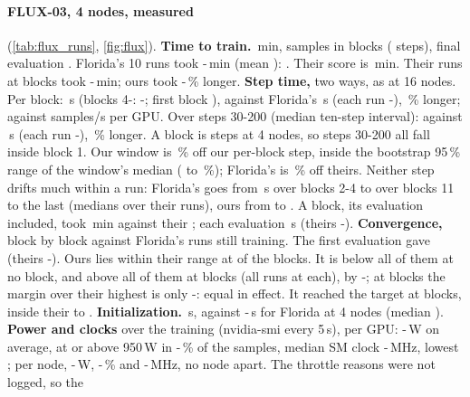 \paragraph{FLUX-03, 4 nodes, measured} (\cref{tab:flux_runs}, \cref{fig:flux}). \textbf{Time to train.} \TriFxFourTttExact\,min, \TriFxFourSamples{} samples in \TriFxFourBlocks{} blocks (\TriFxFourSteps{} steps), final evaluation \TriFxFourLastAcc. Florida's 10 runs took \TriFxFourFlTttLo-\TriFxFourFlTttHi\,min (mean \TriFxFourFlTttMean): \TriFxFourFlBlockCounts. Their score is \TriFxFourFlTttExact\,min. Their \TriFxFourFlSameRuns{} runs at \TriFxFourBlocks{} blocks took \TriFxFourFlSameLo-\TriFxFourFlSameHi\,min; ours took \TriFxFourAboveSameLo-\TriFxFourAboveSameHi\,\% longer. \textbf{Step time,} two ways, as at 16 nodes. Per block: \TriFxFourStep\,s (blocks 4-\TriFxFourBlocks: \TriFxFourStepLo-\TriFxFourStepHi; first block \TriFxFourStepFirst), against Florida's \TriFxFourFlStep\,s (each run \TriFxFourFlStepLo-\TriFxFourFlStepHi), \TriFxFourStepPct\,\% longer; \TriFxFourSpsGpu{} against \TriFxFourFlSpsGpu{} samples/s per GPU. Over steps 30-200 (median ten-step interval): \TriFxFourTen{} against \TriFxFourFlTen\,s (each run \TriFxFourFlTenLo-\TriFxFourFlTenHi), \TriFxFourTenPct\,\% longer. A block is \TriFxFourBlockSteps{} steps at 4 nodes, so steps 30-200 all fall inside block 1. Our window is \TriFxFourTenBlockPct\,\% off our per-block step, inside the bootstrap 95\,\% range of the window's median (\TriFxFourTenBootLo{} to \TriFxFourTenBootHi\,\%); Florida's is \TriFxFourFlTenBlockPct\,\% off theirs. Neither step drifts much within a run: Florida's goes from \TriFxFourFlStepEarly\,s over blocks 2-4 to \TriFxFourFlStepLate{} over blocks 11 to the last (medians over their runs), ours from \TriFxFourStepEarly{} to \TriFxFourStepLate. A block, its evaluation included, took \TriFxFourTpb\,min against their \TriFxFourFlTpb; each evaluation \TriFxFourVal\,s (theirs \TriFxFourFlValLo-\TriFxFourFlValHi). \textbf{Convergence,} block by block against Florida's runs still training. The first evaluation gave \TriFxFourFirstAcc{} (theirs \TriFxFourFlFirstLo-\TriFxFourFlFirstHi). Ours lies within their range at \TriFxFourInside{} of the \TriFxFourCompared{} blocks. It is below all of them at no block, and above all of them at blocks \TriFxFourAbove{} (all \TriFxFourFlRuns{} runs at each), by \TriFxFourAboveLo-\TriFxFourAboveHi; at blocks \TriFxFourClose{} the margin over their highest is only \TriFxFourCloseLo-\TriFxFourCloseHi: equal in effect. It reached the target at \TriFxFourBlocks{} blocks, inside their \TriFxFourFlBlocksLo{} to \TriFxFourFlBlocksHi. \textbf{Initialization.} \TriFxFourInit\,s, against \TriFxFourFlInitLo-\TriFxFourFlInitHi\,s for Florida at 4 nodes (median \TriFxFourFlInitMed). \textbf{Power and clocks} over the training (nvidia-smi every 5\,s), per GPU: \TriFxFourPowerLo-\TriFxFourPowerHi\,W on average, at or above 950\,W in \TriFxFourHotLo-\TriFxFourHotHi\,\% of the samples, median SM clock \TriFxFourSmLo-\TriFxFourSmHi\,MHz, lowest \TriFxFourSmMin; per node, \TriFxFourNodePowerLo-\TriFxFourNodePowerHi\,W, \TriFxFourNodeHotLo-\TriFxFourNodeHotHi\,\% and \TriFxFourNodeSmLo-\TriFxFourNodeSmHi\,MHz, no node apart. The throttle reasons were not logged, so the 